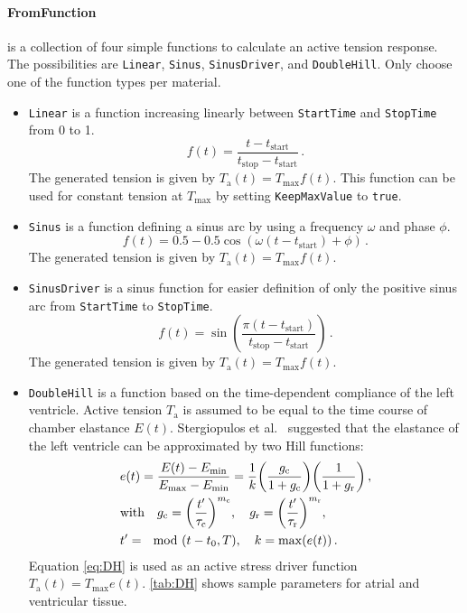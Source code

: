 \paragraph{FromFunction} \label{tension:FromFunction} is a collection of four simple functions to calculate an active tension response.
The possibilities are \verb|Linear|, \verb|Sinus|, \verb|SinusDriver|, and \verb|DoubleHill|.
Only choose one of the function types per material.
\begin{itemize}
    \item 
    \verb|Linear| is a function increasing linearly between \verb|StartTime| and \verb|StopTime| from 0 to 1.
    \begin{equation}
        f(t) = \frac{t - t_\mathrm{start}}{t_\mathrm{stop} - t_\mathrm{start}} \,.
    \end{equation}
    The generated tension is given by $T_\text{a}(t) = T_\text{max} f(t)$.
    This function can be used for constant tension at $T_\text{max}$ by setting \verb|KeepMaxValue| to \verb|true|.

    \item 
    \verb|Sinus| is a function defining a sinus arc by using a frequency $\omega$ and phase $\phi$.
    \begin{equation}
        f(t) = 0.5 - 0.5 \cos(\omega (t - t_\mathrm{start}) + \phi) \,.
    \end{equation}
    The generated tension is given by $T_\text{a}(t) = T_\text{max} f(t)$.

    \item 
    \verb|SinusDriver| is a sinus function for easier definition of only the positive sinus arc from \verb|StartTime| to \verb|StopTime|.
    \begin{equation}
        f(t) = \sin( \frac{\pi (t - t_\mathrm{start})}{t_\mathrm{stop} - t_\mathrm{start}}) \,.
    \end{equation}
    The generated tension is given by $T_\text{a}(t) = T_\text{max} f(t)$.
    
    \item 
    \verb|DoubleHill| is a function based on the time-dependent compliance of the left ventricle.
    Active tension $T_\text{a}$ is assumed to be equal to the time course of chamber elastance $E(t)$.
    Stergiopulos et al.~\cite{Stergiopulos1996} suggested that the elastance of the left ventricle can be approximated by two Hill functions:
    \begin{align}
        &e(t) = \frac{E(t) - E_\text{min}}{E_\text{max} - E_\text{min}} = \frac{1}{k} \qty(\frac{g_\text{c}}{1 + g_\text{c}}) \qty( \frac{1}{1 + g_\text{r}}) \,, \label{eq:DH} \\
        &\qq*{with} g_\text{c} = \qty( \frac{t^\prime}{\tau_\text{c}} )^{m_\text{c}} \qc 
        g_\text{r} = \qty( \frac{t^\prime}{\tau_\text{r}} )^{m_\text{r}} \qc \nonumber \\
        &t^\prime = \mod(t - t_0, T) \qc
        k = \max(e(t)) \,. \nonumber
    \end{align}
Equation \eqref{eq:DH} is used as an active stress driver function $T_\text{a}(t) = T_\text{max} e(t)$. 
\autoref{tab:DH} shows sample parameters for atrial and ventricular tissue.


\end{itemize}
